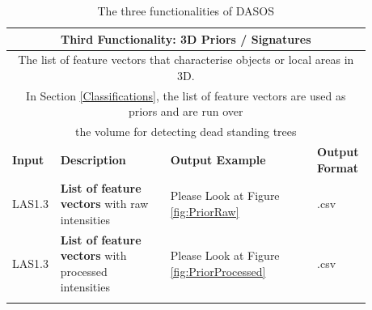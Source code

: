 \documentclass{subfiles}
\begin{document}
	
      			\begin{longtable}
  				{| p{0.08\linewidth}|p{0.3\linewidth}  | p{0.4\linewidth} | p{0.1\linewidth}|  }
        		\toprule
        		\multicolumn{4}{|c|}{\textbf{Third Functionality: 3D Priors / Signatures }} \\
        		\toprule
        		\multicolumn{4}{|c|}{The list of feature vectors that characterise objects or local areas in 3D.}  \\
        		\multicolumn{4}{|c|}{In Section \ref{Classifications}, the list of feature vectors are used as priors and are run over}\\
       			\multicolumn{4}{|c|}{the volume for detecting dead standing trees }\\
        		\toprule
        		\textbf{Input}&\textbf{Description} & \textbf{Output Example} & \textbf{Output Format} \\ 
        		\cmidrule(r){1-1}\cmidrule(lr){2-2}\cmidrule(lr){3-3}\cmidrule(l){4-4}
        		LAS1.3 & \textbf{List of feature vectors} \newline with raw intensities & Please Look at Figure \ref{fig:PriorRaw} & .csv \\
        		\cmidrule(r){1-1}\cmidrule(lr){2-2}\cmidrule(lr){3-3}\cmidrule(l){4-4}
        		LAS1.3 & \textbf{List of feature vectors} \newline with processed intensities & Please Look at Figure \ref{fig:PriorProcessed}  & .csv \\
        		
        		
        		\bottomrule
        		
        		
        		
        		\caption[DASOS's functionalities]{The three functionalities of DASOS}
				\label{tbl:functionalities}	
        	\end{longtable}
        	
		
\end{document}
